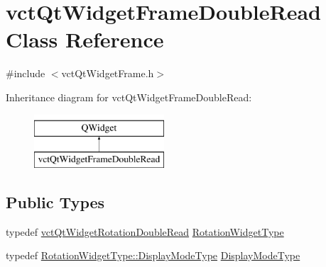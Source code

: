 \hypertarget{classvct_qt_widget_frame_double_read}{}\section{vct\+Qt\+Widget\+Frame\+Double\+Read Class Reference}
\label{classvct_qt_widget_frame_double_read}


{\ttfamily \#include $<$vct\+Qt\+Widget\+Frame.\+h$>$}

Inheritance diagram for vct\+Qt\+Widget\+Frame\+Double\+Read\+:\begin{figure}[H]
\begin{center}
\leavevmode
\includegraphics[height=2.000000cm]{d5/dd1/classvct_qt_widget_frame_double_read}
\end{center}
\end{figure}
\subsection*{Public Types}
\begin{DoxyCompactItemize}
\item 
typedef \hyperlink{classvct_qt_widget_rotation_double_read}{vct\+Qt\+Widget\+Rotation\+Double\+Read} \hyperlink{classvct_qt_widget_frame_double_read_ad3cec78c5f6f6bb0b0defc37f59609f3}{Rotation\+Widget\+Type}
\item 
typedef \hyperlink{classvct_qt_widget_rotation_double_read_a77ae5a0ee5fe231ad2f9dd020aad434c}{Rotation\+Widget\+Type\+::\+Display\+Mode\+Type} \hyperlink{classvct_qt_widget_frame_double_read_afeb1fb838730eda5701c59fd3bc010db}{Display\+Mode\+Type}
\end{DoxyCompactItemize}
